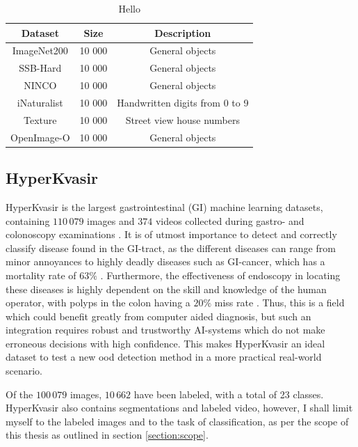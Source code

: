\documentclass[UKenglish]{uiomasterthesis} %
\theoremstyle{definition}
\begin{document}
\begin{table}

\begin{center}
\begin{tabular}{ |c|c|c| } 
    \hline
    Dataset & Size & Description \\
    \hline
    \rowcolor{id!50}
    ImageNet200 & 10 000 & General objects \\ 
    \hline
    \rowcolor{near!50}
    SSB-Hard & 10 000 & General objects \\ 
    \rowcolor{near!50}
    NINCO & 10 000 & General objects \\ 
    \hline
    \rowcolor{far!50}
    iNaturalist & 10 000 & Handwritten digits from 0 to 9 \\ 
    \rowcolor{far!50}
    Texture & 10 000 & Street view house numbers \\ 
    \rowcolor{far!50}
    OpenImage-O & 10 000 & General objects \\ 
    \hline
    \end{tabular}
    \caption{Hello}
    \label{table:imagenet200}
\end{center}
\end{table}

\subsection{HyperKvasir} \label{chapter:hyperkvasir}

HyperKvasir is the largest gastrointestinal (GI) machine learning datasets, containing $110 \,079$ images and $374$ videos collected during gastro- and colonoscopy examinations \cite{hyperkvasir}. It is of utmost importance to detect and correctly classify disease found in the GI-tract, as the different diseases can range from minor annoyances to highly deadly diseases such as GI-cancer, which has a mortality rate of $63 \%$ \cite{hyperkvasir}. Furthermore, the effectiveness of endoscopy in locating these diseases is highly dependent on the skill and knowledge of the human operator, with polyps in the colon having a $20 \%$ miss rate \cite{kaminski2010quality}. Thus, this is a field which could benefit greatly from computer aided diagnosis, but such an integration requires robust and trustworthy AI-systems which do not make erroneous decisions with high confidence. This makes HyperKvasir an ideal dataset to test a new \ac{ood} detection method in a more practical real-world scenario.

Of the $100 \, 079$ images, $10 \, 662$ have been labeled, with a total of 23 classes. HyperKvasir also contains segmentations and labeled video, however, I shall limit myself to the labeled images and to the task of classification, as per the scope of this thesis as outlined in section \ref{section:scope}.
\end{document}
